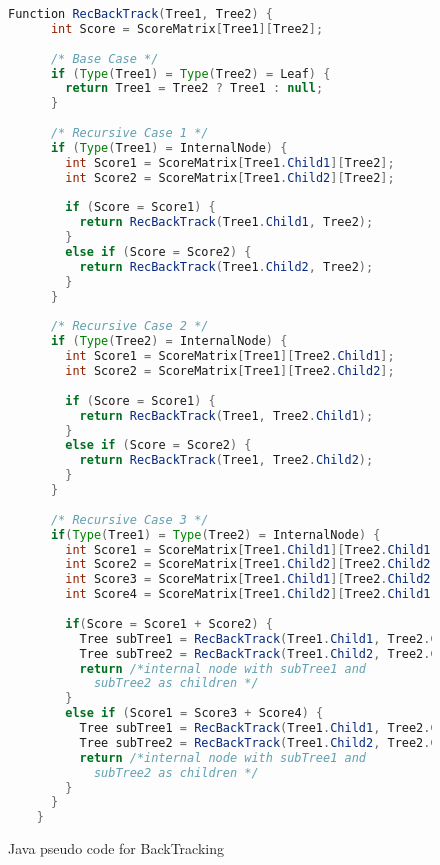 \begin{figure}
	\begin{lstlisting}[language=Java]
	Function RecBackTrack(Tree1, Tree2)	{
	  int Score = ScoreMatrix[Tree1][Tree2];
	  
	  /* Base Case */
	  if (Type(Tree1) = Type(Tree2) = Leaf) {
	    return Tree1 = Tree2 ? Tree1 : null; 
	  }
	  
	  /* Recursive Case 1 */
	  if (Type(Tree1) = InternalNode) {
	    int Score1 = ScoreMatrix[Tree1.Child1][Tree2]; 
	    int Score2 = ScoreMatrix[Tree1.Child2][Tree2];
	  
	    if (Score = Score1) {
	      return RecBackTrack(Tree1.Child1, Tree2);
	    }
	    else if (Score = Score2) {
	      return RecBackTrack(Tree1.Child2, Tree2);
	    }
	  }
	  
	  /* Recursive Case 2 */
	  if (Type(Tree2) = InternalNode) {
	    int Score1 = ScoreMatrix[Tree1][Tree2.Child1]; 
	    int Score2 = ScoreMatrix[Tree1][Tree2.Child2];
	  
	    if (Score = Score1) {
	      return RecBackTrack(Tree1, Tree2.Child1);
	    }
	    else if (Score = Score2) {
	      return RecBackTrack(Tree1, Tree2.Child2);
	    }
	  }	
	  
	  /* Recursive Case 3 */
	  if(Type(Tree1) = Type(Tree2) = InternalNode) {
	    int Score1 = ScoreMatrix[Tree1.Child1][Tree2.Child1];
	    int Score2 = ScoreMatrix[Tree1.Child2][Tree2.Child2];
	    int Score3 = ScoreMatrix[Tree1.Child1][Tree2.Child2];
	    int Score4 = ScoreMatrix[Tree1.Child2][Tree2.Child1];
	
	    if(Score = Score1 + Score2) {
	      Tree subTree1 = RecBackTrack(Tree1.Child1, Tree2.Child1);
	      Tree subTree2 = RecBackTrack(Tree1.Child2, Tree2.Child2);
	      return /*internal node with subTree1 and 
	        subTree2 as children */
	    }
	    else if (Score1 = Score3 + Score4) {
	      Tree subTree1 = RecBackTrack(Tree1.Child1, Tree2.Child2);
          Tree subTree2 = RecBackTrack(Tree1.Child2, Tree2.Child1);
	      return /*internal node with subTree1 and 
	        subTree2 as children */
	    }
	  }
	}
	\end{lstlisting}
	\caption{Java pseudo code for BackTracking}
	\label{Code:Backtracking1}
\end{figure}	

